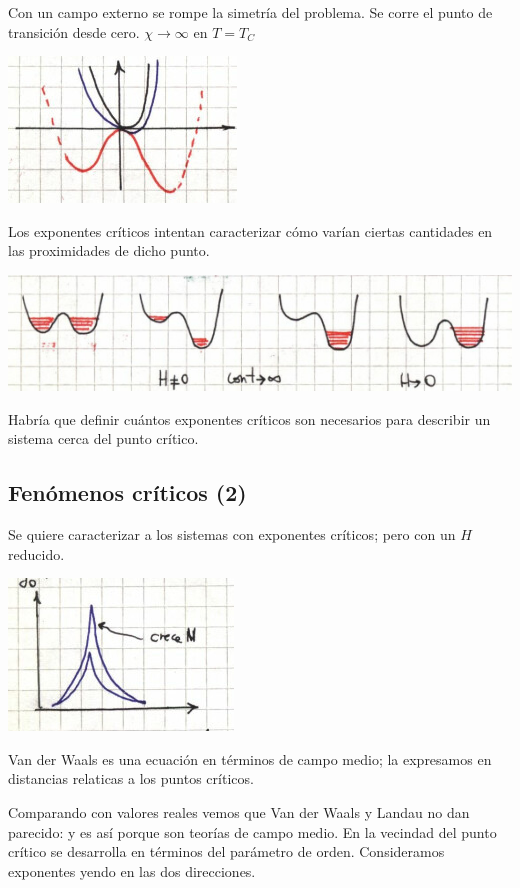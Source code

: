 \documentclass[10pt,oneside]{CBFT_book}
\begin{document}
Con un campo externo se rompe la simetría del problema. Se corre el punto de transición desde cero.
$\chi \to \infty$ en $T=T_C$

\includegraphics[scale=0.4]{images/1606337058.jpg}

Los exponentes críticos intentan caracterizar cómo varían ciertas cantidades en las proximidades de dicho punto.


\includegraphics[scale=0.4]{images/1606337061.jpg}

Habría que definir cuántos exponentes críticos son necesarios para describir un sistema cerca del punto crítico.

\subsection{Fenómenos críticos (2)}

Se quiere caracterizar a los sistemas con exponentes críticos; pero con un $H$ reducido.

\includegraphics[scale=0.4]{images/1606337120.jpg}

Van der Waals es una ecuación en términos de campo medio; la expresamos en distancias relaticas a los puntos
críticos.

Comparando con valores reales vemos que Van der Waals y Landau no dan parecido: y es así porque son teorías de
campo medio.
En la vecindad del punto crítico se desarrolla en términos del parámetro de orden. Consideramos exponentes
yendo en las dos direcciones.
\end{document}
